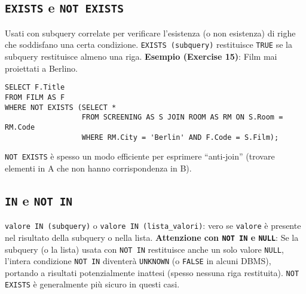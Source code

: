 \subsection{\texttt{EXISTS} e \texttt{NOT EXISTS}}
Usati con subquery correlate per verificare l'esistenza (o non esistenza) di righe che soddisfano una certa condizione.
\texttt{EXISTS (subquery)} restituisce \texttt{TRUE} se la subquery restituisce almeno una riga.
\textbf{Esempio (Exercise 15)}: Film mai proiettati a Berlino.
\begin{verbatim}
SELECT F.Title
FROM FILM AS F
WHERE NOT EXISTS (SELECT *
                  FROM SCREENING AS S JOIN ROOM AS RM ON S.Room = RM.Code
                  WHERE RM.City = 'Berlin' AND F.Code = S.Film);
\end{verbatim}
\texttt{NOT EXISTS} è spesso un modo efficiente per esprimere ``anti-join'' (trovare elementi in A che non hanno corrispondenza in B).

\subsection{\texttt{IN} e \texttt{NOT IN}}
\texttt{valore IN (subquery)} o \texttt{valore IN (lista\_valori)}: vero se \texttt{valore} è presente nel risultato della subquery o nella lista.
\textbf{Attenzione con \texttt{NOT IN} e \texttt{NULL}}: Se la subquery (o la lista) usata con \texttt{NOT IN} restituisce anche un solo valore \texttt{NULL}, l'intera condizione \texttt{NOT IN} diventerà \texttt{UNKNOWN} (o \texttt{FALSE} in alcuni DBMS), portando a risultati potenzialmente inattesi (spesso nessuna riga restituita). \texttt{NOT EXISTS} è generalmente più sicuro in questi casi.

